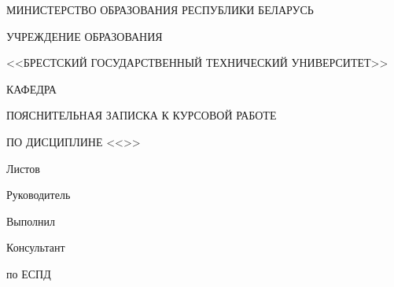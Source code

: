 \begin{center}
    МИНИСТЕРСТВО ОБРАЗОВАНИЯ РЕСПУБЛИКИ БЕЛАРУСЬ

    \hspace{0pt}

    УЧРЕЖДЕНИЕ ОБРАЗОВАНИЯ

    <<БРЕСТСКИЙ ГОСУДАРСТВЕННЫЙ ТЕХНИЧЕСКИЙ УНИВЕРСИТЕТ>>

    \hspace{0pt}

    КАФЕДРА \titlePageKafedra
\end{center}

\vfill

\begin{center}
    \titlePageTopic

    \hspace{0pt}

    ПОЯСНИТЕЛЬНАЯ ЗАПИСКА К КУРСОВОЙ РАБОТЕ

    ПО ДИСЦИПЛИНЕ <<\titlePageDistiplina>>
\end{center}

\vfill

\begin{center}
    \codePZ

    \hspace{0pt}

    Листов \pageref{LastPage}
\end{center}

\vfill

\begin{flushright}
    \begin{minipage}[t]{.49\textwidth}
        \begin{minipage}[t]{.75\textwidth}
            \begin{flushright}
                Руководитель

                Выполнил

                Консультант

                по ЕСПД
            \end{flushright}
        \end{minipage}
    \end{minipage}
    \begin{minipage}[t]{.49\textwidth}
        \begin{flushright}
            \begin{minipage}[t]{.75\textwidth}
                \titlePageLeaderName~\titlePageLeaderSurname

                \titlePageAuthorName~\titlePageAuthorSurname

                \hspace{0pt}

                \titlePageConsultantName~\titlePageConsultantSurname
            \end{minipage}
        \end{flushright}
        
    \end{minipage}
\end{flushright}

\vfill

\begin{center}
    \ESKDtheYear
\end{center}